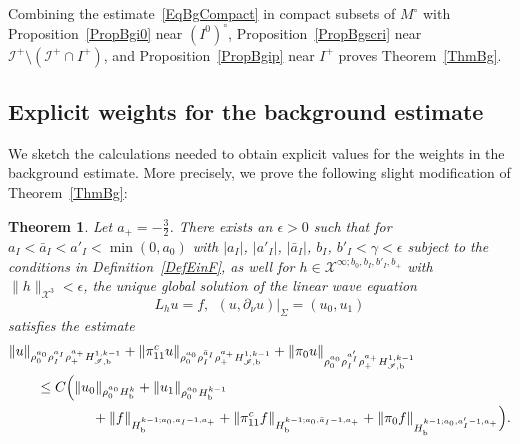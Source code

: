 \documentclass[reqno,11pt,letterpaper]{amsart}
\numberwithin{equation}{section}
\numberwithin{figure}{section}
\newtheorem{thm}{Theorem}[section]
\theoremstyle{definition}
\theoremstyle{remark}
\newcommand{\mc}{\mathcal}
\newcommand{\cX}{\mc X}
\newcommand{\ms}{\mathscr}
\newcommand{\scri}{\ms I}
\newcommand{\eps}{\epsilon}
\newcommand{\pa}{\partial}
\newcommand{\bop}{{\mathrm{b}}}
\newcommand{\Hb}{H_{\bop}}
\newcommand{\Hscrib}{H_{\scri,\bop}}
\begin{document}
Combining the estimate~\eqref{EqBgCompact} in compact subsets of $M^\circ$ with Proposition~\ref{PropBgi0} near $(I^0)^\circ$, Proposition~\ref{PropBgscri} near $\scri^+\setminus(\scri^+\cap I^+)$, and Proposition~\ref{PropBgip} near $I^+$ proves Theorem~\ref{ThmBg}.


\subsection{Explicit weights for the background estimate}
\label{SsBgExpl}

We sketch the calculations needed to obtain explicit values for the weights in the background estimate. More precisely, we prove the following slight modification of Theorem~\ref{ThmBg}:

\begin{thm}
\label{ThmBgExpl}
  Let $a_+=-\tfrac32$. There exists an $\eps>0$ such that for $a_I<\bar a_I<a'_I<\min(0,a_0)$ with $|a_I|$, $|a'_I|$, $|\bar a_I|$, $b_I$, $b'_I<\gamma<\eps$ subject to the conditions in Definition~\ref{DefEinF}, as well for $h\in\cX^{\infty;b_0,b_I,b'_I,b_+}$ with $\|h\|_{\cX^3}<\eps$, the unique global solution of the linear wave equation
  \[
    L_h u = f, \ \ (u,\pa_\nu u)|_\Sigma = (u_0,u_1)
  \]
  satisfies the estimate
  \begin{equation}
  \label{EqBgExpl}
  \begin{split}
    &\|u\|_{\rho_0^{a_0}\rho_I^{a_I}\rho_+^{a_+}\Hscrib^{1,k-1}} + \|\pi_{1 1}^c u\|_{\rho_0^{a_0}\rho_I^{\bar a_I}\rho_+^{a_+}\Hscrib^{1,k-1}} + \|\pi_0 u\|_{\rho_0^{a_0}\rho_I^{a'_I}\rho_+^{a_+}\Hscrib^{1,k-1}} \\
    &\qquad \leq C\Bigl(\|u_0\|_{\rho_0^{a_0}\Hb^k}+\|u_1\|_{\rho_0^{a_0}\Hb^{k-1}} \\
    &\qquad\qquad\qquad + \|f\|_{\Hb^{k-1;a_0,a_I-1,a_+}} + \|\pi_{1 1}^c f\|_{\Hb^{k-1;a_0,\bar a_I-1,a_+}} + \|\pi_0 f\|_{\Hb^{k-1;a_0,a'_I-1,a_+}}\Bigr).
  \end{split}
  \end{equation}
\end{thm}
\end{document}
